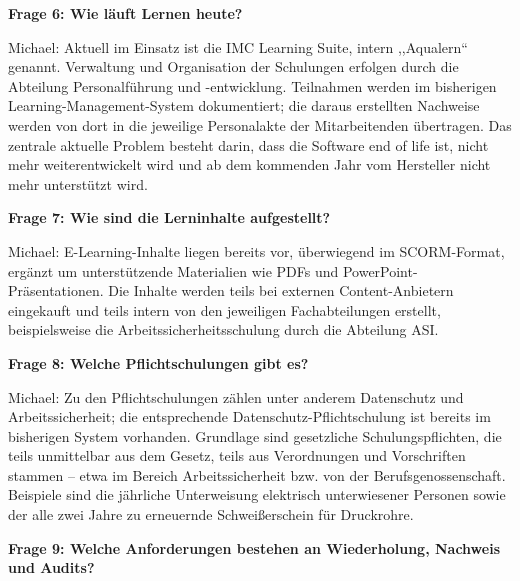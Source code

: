 \documentclass[
    12pt, 
    a4paper,
    ]{scrartcl} %
\begin{document}
\bigskip
{}

\textbf{Frage 6: Wie l\"auft Lernen heute?}

Michael: Aktuell im Einsatz ist die IMC Learning Suite, intern ,,Aqualern`` genannt. Verwaltung und Organisation der Schulungen erfolgen durch die Abteilung Personalf\"uhrung und -entwicklung. Teilnahmen werden im bisherigen Learning-Management-System dokumentiert; die daraus erstellten Nachweise werden von dort in die jeweilige Personalakte der Mitarbeitenden \"ubertragen. Das zentrale aktuelle Problem besteht darin, dass die Software end of life ist, nicht mehr weiterentwickelt wird und ab dem kommenden Jahr vom Hersteller nicht mehr unterst\"utzt wird.

\medskip
\textbf{Frage 7: Wie sind die Lerninhalte aufgestellt?}

Michael: E-Learning-Inhalte liegen bereits vor, \"uberwiegend im SCORM-Format, erg\"anzt um unterst\"utzende Materialien wie PDFs und PowerPoint-Pr\"asentationen. Die Inhalte werden teils bei externen Content-Anbietern eingekauft und teils intern von den jeweiligen Fachabteilungen erstellt, beispielsweise die Arbeitssicherheitsschulung durch die Abteilung ASI.

\bigskip
{}

\textbf{Frage 8: Welche Pflichtschulungen gibt es?}

Michael: Zu den Pflichtschulungen z\"ahlen unter anderem Datenschutz und Arbeitssicherheit; die entsprechende Datenschutz-Pflichtschulung ist bereits im bisherigen System vorhanden. Grundlage sind gesetzliche Schulungspflichten, die teils unmittelbar aus dem Gesetz, teils aus Verordnungen und Vorschriften stammen -- etwa im Bereich Arbeitssicherheit bzw. von der Berufsgenossenschaft. Beispiele sind die j\"ahrliche Unterweisung elektrisch unterwiesener Personen sowie der alle zwei Jahre zu erneuernde Schwei{\ss}erschein f\"ur Druckrohre.

\medskip
\textbf{Frage 9: Welche Anforderungen bestehen an Wiederholung, Nachweis und Audits?}
\end{document}
